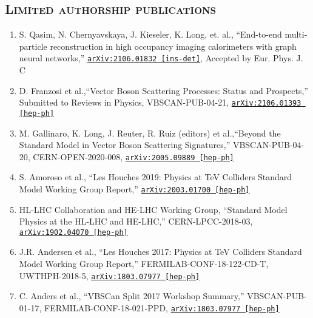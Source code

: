 \documentclass[10pt]{res} %
\begin{document}
\begin{resume}
\section{\textsc{Limited authorship publications}}
\begin{enumerate}[itemindent=1mm,labelsep=1mm]
  \item S. Qasim, N. Chernyavskaya, J. Kieseler, K. Long, et. al., ``End-to-end multi-particle reconstruction in high occupancy imaging calorimeters with graph neural networks,'' \href{https://arxiv.org/abs/2106.01832}{\texttt{arXiv:2106.01832 [ins-det]}}, Accepted by Eur. Phys. J. C
  \item D. Franzosi et al.,``Vector Boson Scattering Processes: Status and Prospects,''
    Submitted to Reviews in Physics, VBSCAN-PUB-04-21, \href{https://arxiv.org/abs/2106.01393}{\texttt{arXiv:2106.01393 [hep-ph]}}
  \item M. Gallinaro, K. Long, J. Reuter, R. Ruiz (editors) et al.,``Beyond the Standard Model in Vector Boson Scattering Signatures,''
    VBSCAN-PUB-04-20, CERN-OPEN-2020-008, \href{https://arxiv.org/abs/2005.09889}{\texttt{arXiv:2005.09889 [hep-ph]}}
  \item S. Amoroso et al., ``Les Houches 2019: Physics at TeV Colliders Standard Model Working Group Report,''
    \href{https://arxiv.org/abs/2003.01700 } {\texttt{arXiv:2003.01700 [hep-ph]}}
  \item HL-LHC Collaboration and HE-LHC Working Group, ``Standard Model Physics at the HL-LHC and HE-LHC,''
    CERN-LPCC-2018-03, \href{https://arxiv.org/abs/1902.04070}{\texttt{arXiv:1902.04070 [hep-ph]}}
  \item J.R. Andersen et al., ``Les Houches 2017: Physics at TeV Colliders Standard Model Working Group Report,''
    FERMILAB-CONF-18-122-CD-T, UWTHPH-2018-5, \href{https://arxiv.org/abs/1803.07977}{\texttt{arXiv:1803.07977 [hep-ph]}}
  \item C. Anders et al., ``VBSCan Split 2017 Workshop Summary,'' 
    VBSCAN-PUB-01-17, FERMILAB-CONF-18-021-PPD, \href{https://arxiv.org/abs/1801.04203}{\texttt{arXiv:1803.07977  [hep-ph]}}
\end{enumerate}


\end{resume}
\end{document}
